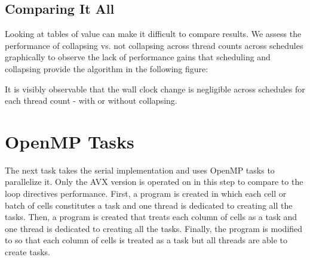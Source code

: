 \documentclass{article}
\begin{document}
\subsection{Comparing It All}
Looking at tables of value can make it difficult to compare results. We assess 
the performance of collapsing vs. not collapsing across thread counts across schedules 
graphically to observe the lack of performance gains that scheduling and collapsing provide 
the algorithm in the following figure:
\begin{figure}[H]
    \centering
\end{figure}
\noindent It is visibly observable that the wall clock change is negligible across schedules for each thread count - with or without collapsing.

\section{OpenMP Tasks}
The next task takes the serial implementation and uses OpenMP tasks to parallelize it. Only 
the AVX version is operated on in this step to compare to the loop directives performance. First, 
a program is created in which each cell or batch of cells constitutes a task and one thread 
is dedicated to creating all the tasks. Then, a program is created that treats each 
column of cells as a task and one thread is dedicated to creating all the tasks. Finally, 
the program is modified to so that each column of cells is treated as a task but all threads are able to create tasks.
\end{document}
